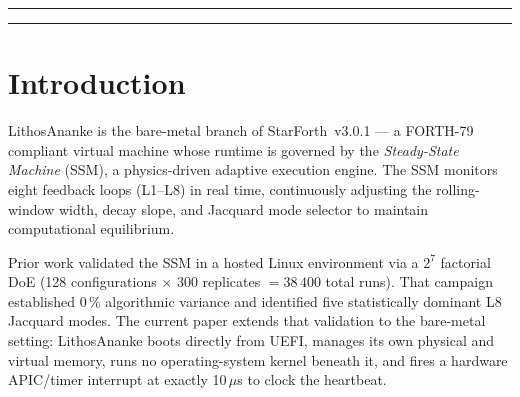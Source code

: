 \documentclass[10pt,a4paper]{article}
\begin{document}
\begin{abstract}
\medskip\noindent
\textbf{ACL Extension (June 2026).}
A subsequent campaign adds the word-level access control (ACL) capsule
(\texttt{ACL.4th}) to the baseline system and measures its enforcement
overhead across the same $3\times3$ Latin-square design.  The ACL system
introduces a two-level check per word: a hot-path TTL decrement (one
compare-and-decrement per execution) and a cold-path recheck when the
TTL expires.  At the initial floor of \texttt{ACL-BASE-TTL}~=~16, a
dramatic ISA gap emerged: \textsc{amd64} incurred only $+0.08$\,\% overhead
while \textsc{aarch64} and \textsc{riscv64} reached $+62$--$68$\,\%,
caused by architecture-specific cold-word heat profiles under TCG emulation.
Raising the floor to 256 reduced the gap to $\approx\!4$\,\%.  The final
mitigation applies the same compudynamic feedback topology used by the
existing physics loops (ring buffer~+~slope inference, mirroring
Loops~\#2+\#3+\#6) to the ACL TTL itself, creating the \emph{ACL Rolling
Window of Truth} (ACL-RWT).  The ACL-RWT starts every word at
\texttt{ACL-MAX-TTL}~=~65535 (fully open) and converges to a natural
attractor driven by each word's actual call rate.  The new $3\times3$
campaign confirms overhead of $+0.005$\,\% (\textsc{amd64}) and
$+0.008$\,\% (\textsc{aarch64}/\textsc{riscv64}) --- the ISA gap is
closed to within a factor of~$1.6\times$ at sub-$0.01$\,\% absolute
overhead, three orders of magnitude below the original Floor~=~16 result.
\end{abstract}

\bigskip
\hrule
\tableofcontents
\hrule
\bigskip

\section{Introduction}
\label{sec:intro}

LithosAnanke is the bare-metal branch of StarForth~v3.0.1 --- a FORTH-79
compliant virtual machine whose runtime is governed by the \emph{Steady-State
Machine} (SSM), a physics-driven adaptive execution engine.  The SSM monitors
eight feedback loops (L1--L8) in real time, continuously adjusting the
rolling-window width, decay slope, and Jacquard mode selector to maintain
computational equilibrium.

Prior work validated the SSM in a hosted Linux environment via a \(2^7\)
factorial DoE (128 configurations \(\times\) 300 replicates \(= 38\,400\) total
runs).  That campaign established 0\,\% algorithmic variance and identified five
statistically dominant L8 Jacquard modes.  The current paper extends that
validation to the bare-metal setting: LithosAnanke boots directly from UEFI,
manages its own physical and virtual memory, runs no operating-system kernel
beneath it, and fires a hardware APIC/timer interrupt at exactly 10\,\(\mu\)s to
clock the heartbeat.
\end{document}
